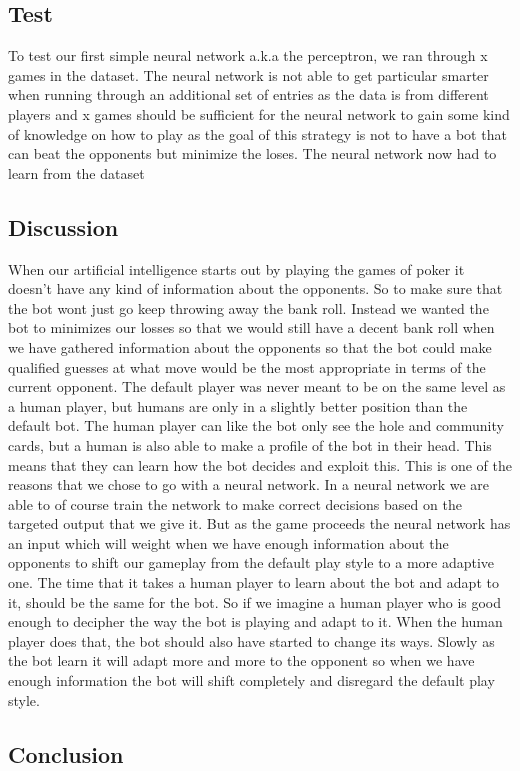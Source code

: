 



\subsection{Test}
To test our first simple neural network a.k.a the perceptron, we ran through x games in the dataset. The neural network is not able to get particular smarter when running through an additional set of entries as the data is from different players and x games should be sufficient for the neural network to gain some kind of knowledge on how to play as the goal of this strategy is not to have a bot that can beat the opponents but minimize the loses.
The neural network now had to learn from the dataset 
 


\subsection{Discussion}
When our artificial intelligence starts out by playing the games of poker it doesn't have any kind of information about the opponents. So to make sure that the bot wont just go keep throwing away the bank roll. Instead we wanted the bot to minimizes our losses so that we would still have a decent bank roll when we have gathered information about the opponents so that the bot could make qualified guesses at what move would be the most appropriate in terms of the current opponent. The default player was never meant to be on the same level as a human player, but humans are only in a slightly better position than the default bot. The human player can like the bot only see the hole and community cards, but a human is also able to make a profile of the bot in their head. This means that they can learn how the bot decides and exploit this. 
This is one of the reasons that we chose to go with a neural network. In a neural network we are able to of course train the network to make correct decisions based on the targeted output that we give it.
But as the game proceeds the neural network has an input which will weight when we have enough information about the opponents to shift our gameplay from the default play style to a more adaptive one.
The time that it takes a human player to learn about the bot and adapt to it, should be the same for the bot. So if we imagine a human player who is good enough to decipher the way the bot is playing and adapt to it. When the human player does that, the bot should also have started to change its ways. Slowly as the bot learn it will adapt more and more to the opponent so when we have enough information the bot will shift completely and disregard the default play style.
\subsection{Conclusion}
